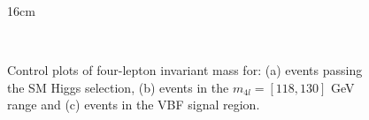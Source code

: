 \begin{figure}[hbtp]{16cm}
	\caption{Control plots of four-lepton invariant mass for: (a) events passing the SM Higgs selection, (b) events in the $m_{4l} = [118,130]$ GeV range and (c) events in the VBF signal region.}
	\centering
	\\

\end{figure}
